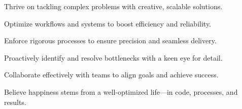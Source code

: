 

\begin{cvbullets}
  \item {Thrive on tackling complex problems with creative, scalable solutions.}
  \item {Optimize workflows and systems to boost efficiency and reliability.}
  \item {Enforce rigorous processes to ensure precision and seamless delivery.}
  \item {Proactively identify and resolve bottlenecks with a keen eye for detail.}
  \item {Collaborate effectively with teams to align goals and achieve success.}
  \item {Believe happiness stems from a well-optimized life—in code, processes, and results.}
\end{cvbullets}

